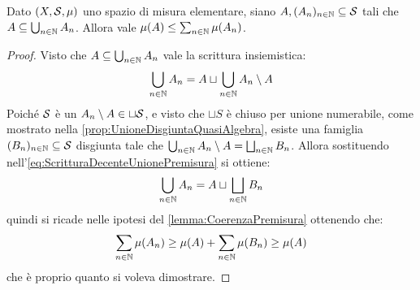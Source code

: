 \begin{lemma}\label{lemma:PiuCheMonotonaPremisura}
	Dato $(X,\S,\mu)$ uno spazio di misura elementare, siano $A,(A_n)_{n\in\N}\subseteq \S$ tali che $A\subseteq\bigcup_{n\in\N}A_n$.
	Allora vale $\mu(A)\le \sum_{n\in\N}\mu(A_n)$.
\end{lemma}
\begin{proof}
	Visto che $A\subseteq\bigcup_{n\in\N}A_n$ vale la scrittura insiemistica:
	\begin{equation}\label{eq:ScritturaDecenteUnionePremisura}
		\bigcup_{n\in\N}A_n=A\sqcup\bigcup_{n\in\N}A_n\setminus A
	\end{equation}
	Poiché $\S$ è un \semiring{} $A_n\setminus A\in \sqcup \S$, e visto che $\sqcup S$ è chiuso per unione numerabile, come mostrato nella \cref{prop:UnioneDisgiuntaQuasiAlgebra}, esiste una famiglia $(B_n)_{n\in\N}\subseteq\S$ disgiunta tale che $\bigcup_{n\in\N}A_n\setminus A=\bigsqcup_{n\in\N}B_n$.
	Allora sostituendo nell'\cref{eq:ScritturaDecenteUnionePremisura} si ottiene:
	\begin{equation*}
		\bigcup_{n\in\N}A_n=A\sqcup\bigsqcup_{n\in\N}B_n
	\end{equation*}
	quindi si ricade nelle ipotesi del \cref{lemma:CoerenzaPremisura} ottenendo che:
	\begin{equation*}
		\sum_{n\in\N}\mu(A_n)\ge \mu(A)+\sum_{n\in\N}\mu(B_n)\ge \mu(A)
	\end{equation*}
	che è proprio quanto si voleva dimostrare.
\end{proof}



